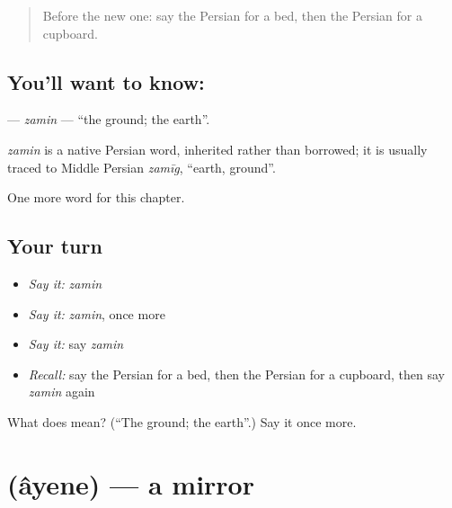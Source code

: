 \label{lesson:FA-C46-zamin}



\begin{quote}
Before the new one: say the Persian for a bed, then the Persian for a cupboard.
\end{quote}

\subsection*{You'll want to know: }
\textbf{} — \emph{zamin} — \textquotedblleft{}the ground; the earth\textquotedblright{}.

\begin{cousinweb}
\emph{zamin} is a native Persian word, inherited rather than borrowed; it is usually traced to Middle Persian \emph{zamīg}, \textquotedblleft{}earth, ground\textquotedblright{}.
\end{cousinweb}

\begin{grammarlens}[title={What you've built}]
One more word for this chapter.
\end{grammarlens}

\subsection*{Your turn}
\begin{itemize}
\raggedright
  \item \emph{Say it:} \emph{zamin}
  \item \emph{Say it:} \emph{zamin}, once more
  \item \emph{Say it:} say \emph{zamin}
  \item \emph{Recall:} say the Persian for a bed, then the Persian for a cupboard, then say \emph{zamin} again
\end{itemize}

\begin{tcolorbox}[breakable,colback=teal!4,colframe=teal!35!black,title={Before you move on}]
What does  mean? (\textquotedblleft{}The ground; the earth\textquotedblright{}.) Say it once more.
\end{tcolorbox}
\section[\texorpdfstring{\fa{آینه} (âyene)}{آینه (âyene)}]{ (âyene) — a mirror}

\label{lesson:FA-C46-ayene}



